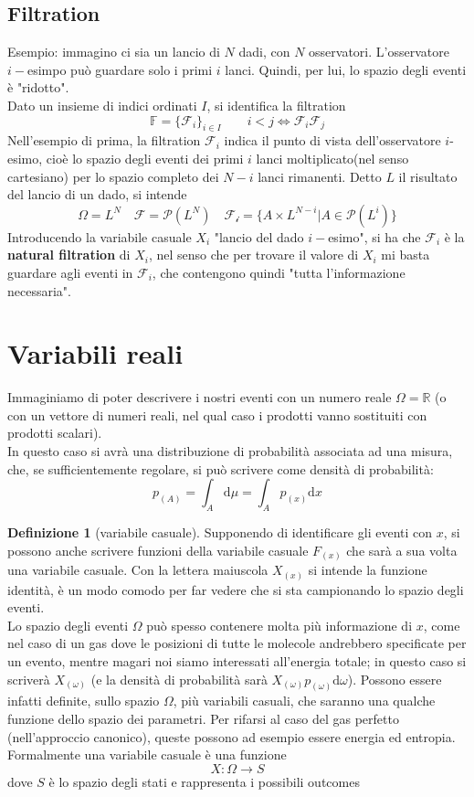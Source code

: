 \documentclass[a4paper,12pt]{article}
\renewcommand{\arg}[1]{_{(#1)}}
\theoremstyle{plain}
\theoremstyle{definition}
\newtheorem{defn}{Definizione}[section]
\newcommand{\Op}[1]{\mathcal{#1}}
\newcommand{\ifandonlyif}{\Longleftrightarrow}
\renewcommand{\d}{\text{d}}
\newcommand{\ra}{\rightarrow}
\theoremstyle{remark}
\begin{document}
\subsection{Filtration}
Esempio: immagino ci sia un lancio di $N$ dadi, con $N$ osservatori. L'osservatore $i-$esimpo può guardare solo i primi $i$ lanci. Quindi, per lui, lo spazio degli eventi è "ridotto". \\Dato un insieme di indici ordinati $I$, si identifica la filtration
\[\mathbb{F}=\{\Op{F}_i\}_{i\in I}	\quad \quad i<j\ifandonlyif\Op{F}_i \Op{F}_j	\]
Nell'esempio di prima, la filtration $\Op{F}_i$ indica il punto di vista dell'osservatore $i$-esimo, cioè lo spazio degli eventi dei primi $i$ lanci moltiplicato(nel senso cartesiano) per lo spazio completo dei $N-i$ lanci rimanenti.
Detto $L$ il risultato del lancio di un dado, si intende
\[\Omega=L^N\quad\Op{F}=\Op{P}(L^N)\quad		\Op{F_i}=\{A\times L^{N-i}|A\in \Op{P}(L^i)\}	\]
Introducendo la variabile casuale $X_i$ "lancio del dado $i-$esimo", si ha che $\Op{F}_i$ è la \textbf{natural filtration} di $X_i$, nel senso che per trovare il valore di $X_i$ mi basta guardare agli eventi in $\Op{F}_i$, che contengono quindi "tutta l'informazione necessaria".

\section{Variabili reali}

Immaginiamo di poter descrivere i nostri eventi con un numero reale $\Omega=\mathbb{R}$ (o con un vettore di numeri reali, nel qual caso i prodotti vanno sostituiti con prodotti scalari).
\\In questo caso si avrà una distribuzione di probabilità associata ad una misura, che, se sufficientemente regolare, si può scrivere come densità di probabilità: 
\[p\arg{A}=\int_A \d\mu=\int_A p\arg{x}\d x		\]
\begin{defn}[variabile casuale]
	Supponendo di identificare gli eventi con $x$, si possono anche scrivere funzioni della variabile casuale $F\arg{x}$ che sarà a sua volta una variabile casuale. Con la lettera maiuscola $X\arg{x}$ si intende la funzione identità, è un modo comodo per far vedere che si sta campionando lo spazio degli eventi. \\Lo spazio degli eventi $\Omega$ può spesso contenere molta più informazione di $x$, come nel caso di un gas  dove le posizioni di tutte le molecole andrebbero specificate per un evento, mentre magari noi siamo interessati all'energia totale; in questo caso si scriverà $X\arg{\omega}$ (e la densità di probabilità sarà $X\arg{\omega}p\arg{\omega} \d \omega$). Possono essere infatti definite, sullo spazio $\Omega$, più variabili casuali, che saranno una qualche funzione dello spazio dei parametri. Per rifarsi al caso del gas perfetto (nell'approccio canonico), queste possono ad esempio essere energia ed entropia. 
	\\Formalmente una variabile casuale è una funzione
	\[X:\Omega\ra S\]
	dove $S$ è lo spazio degli stati e rappresenta i possibili outcomes
\end{defn}
\end{document}
